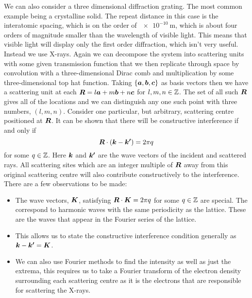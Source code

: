 \documentclass[a4paper]{article}
\begin{document}
    We can also consider a three dimensional diffraction grating.
    The most common example being a crystalline solid.
    The repeat distance in this case is the interatomic spacing, which is on the order of \(\SI{e-10}{\metre}\), which is about four orders of magnitude smaller than the wavelength of visible light.
    This means that visible light will display only the first order diffraction, which isn't very useful.
    Instead we use X-rays.
    Again we can decompose the system into scattering units with some given transmission function that we then replicate through space by convolution with a three-dimensional Dirac comb and multiplication by some three-dimensional top hat function.
    Taking \(\{\bm{a}, \bm{b}, \bm{c}\}\) as basis vectors then we have a scattering unit at each \(\bm{R} = l\bm{a} + m\bm{b} + n\bm{c}\) for \(l, m, n\in\mathbb{Z}\).
    The set of all such \(\bm{R}\) gives all of the locations and we can distinguish any one such point with three numbers, \((l, m, n)\).
    Consider one particular, but arbitrary, scattering centre positioned at \(\bm{R}\).
    It can be shown that there will be constructive interference if and only if
    \[\bm{R}\cdot(\bm{k} - \bm{k'}) = 2\pi q\]
    for some \(q\in\mathbb{Z}\).
    Here \(\bm{k}\) and \(\bm{k'}\) are the wave vectors of the incident and scattered rays.
    All scattering sites which are an integer multiple of \(\bm{R}\) away from this original scattering centre will also contribute constructively to the interference.
    There are a few observations to be made:
    \begin{itemize}
        \item The wave vectors, \(\bm{K}\), satisfying \(\bm{R}\cdot\bm{K} = 2\pi q\) for some \(q\in\mathbb{Z}\) are special.
        The correspond to harmonic waves with the same periodicity as the lattice.
        These are the waves that appear in the Fourier series of the lattice.
        \item This allows us to state the constructive interference condition generally as \(\bm{k} - \bm{k'} = \bm{K}\).
        \item We can also use Fourier methods to find the intensity as well as just the extrema, this requires us to take a Fourier transform of the electron density surrounding each scattering centre as it is the electrons that are responsible for scattering the X-rays.
    \end{itemize}
\end{document}

